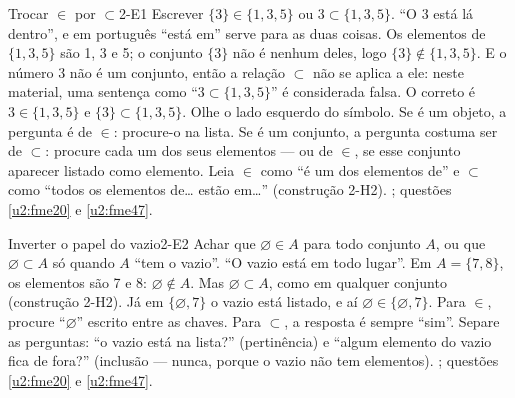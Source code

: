 \ErrosComuns

\begin{erro}{Trocar $\in$ por $\subset$}{2-E1}
 Escrever $\{3\}\in\{1,3,5\}$ ou $3\subset\{1,3,5\}$.
 \enquote{O 3 está lá dentro}, e em português \enquote{está em} serve para as duas coisas.
 Os elementos de $\{1,3,5\}$ são 1, 3 e 5; o conjunto $\{3\}$ não é nenhum deles, logo $\{3\}\notin\{1,3,5\}$. E o número 3 não é um conjunto, então a relação $\subset$ não se aplica a ele: neste material, uma sentença como \enquote{$3\subset\{1,3,5\}$} é considerada falsa. O correto é $3\in\{1,3,5\}$ e $\{3\}\subset\{1,3,5\}$.
 Olhe o lado esquerdo do símbolo. Se é um objeto, a pergunta é de $\in$: procure-o na lista. Se é um conjunto, a pergunta costuma ser de $\subset$: procure cada um dos seus elementos — ou de $\in$, se esse conjunto aparecer listado como elemento.
 Leia $\in$ como \enquote{é um dos elementos de} e $\subset$ como \enquote{todos os elementos de\ldots{} estão em\ldots} (construção 2-H2).
 ; questões \ref{u2:fme20} e \ref{u2:fme47}.
\end{erro}

\begin{erro}{Inverter o papel do vazio}{2-E2}
 Achar que $\varnothing\in A$ para todo conjunto $A$, ou que $\varnothing\subset A$ só quando $A$ \enquote{tem o vazio}.
 \enquote{O vazio está em todo lugar}.
 Em $A=\{7,8\}$, os elementos são 7 e 8: $\varnothing\notin A$. Mas $\varnothing\subset A$, como em qualquer conjunto (construção 2-H2). Já em $\{\varnothing,7\}$ o vazio está listado, e aí $\varnothing\in\{\varnothing,7\}$.
 Para $\in$, procure \enquote{$\varnothing$} escrito entre as chaves. Para $\subset$, a resposta é sempre \enquote{sim}.
 Separe as perguntas: \enquote{o vazio está na lista?} (pertinência) e \enquote{algum elemento do vazio fica de fora?} (inclusão — nunca, porque o vazio não tem elementos).
 ; questões \ref{u2:fme20} e \ref{u2:fme47}.
\end{erro}

